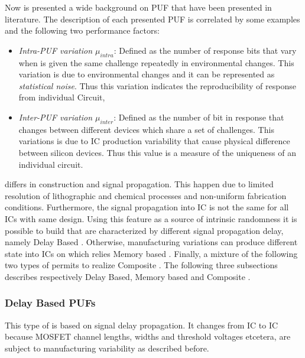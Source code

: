 \documentclass[../tesi.tex]{subfiles}
\begin{document}
Now is presented a wide background on PUF that have been presented in literature. 
The description of each presented PUF is correlated by some examples and the following two performance factors:
\begin{itemize}
\item \textit{Intra-PUF variation $\mu_{intra}$}: Defined as the number of \puf{} response bits that vary when is given the same challenge repeatedly in environmental changes. This variation is due to environmental changes and it can be represented as \emph{statistical noise}. Thus this variation indicates the reproducibility of response from individual \puf{} Circuit,
\item \textit{Inter-PUF variation  $\mu_{inter}$}: Defined as the number of bit in \puf{} response that changes between different devices which share a set of challenges. This variations is due to IC production variability that cause physical difference between silicon devices. Thus this value is a measure of the uniqueness of an individual \puf{} circuit. 
\end{itemize}
 differs in construction and signal propagation. This happen due to limited resolution of lithographic and chemical processes and non-uniform fabrication conditions. Furthermore, the signal propagation into IC is not the same for all ICs with same design. 
Using this feature as a source of intrinsic randomness it is possible to build  that are characterized by different signal propagation delay, namely Delay Based . Otherwise, manufacturing variations can produce different state into ICs on which relies Memory based . Finally, a mixture of the following two types of \puf{} permits to realize  Composite . 
The following three subsections describes respectively Delay Based, Memory based and Composite . 
\subsubsection{Delay Based PUFs}
This type of  is based on signal delay propagation. It changes from IC to IC because MOSFET channel lengths, widths and threshold voltages etcetera, are subject to manufacturing variability as described before. 
\end{document}
